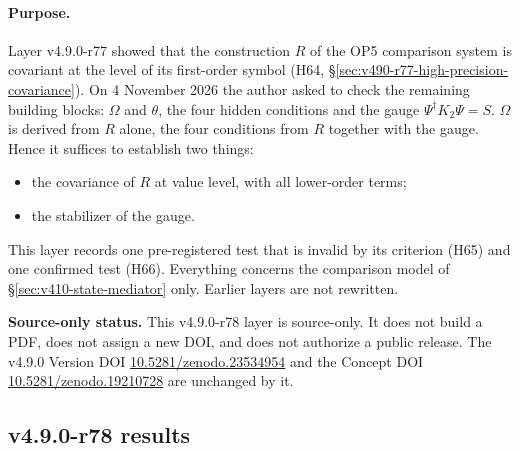 \paragraph{Purpose.}
Layer v4.9.0-r77 showed that the construction \(R\) of the OP5 comparison system is covariant at the level of its first-order
symbol (H64, \S\ref{sec:v490-r77-high-precision-covariance}).  On 4 November 2026 the author asked to check the remaining
building blocks: \(\Omega\) and \(\theta\), the four hidden conditions and the gauge \(\Psi^\dagger K_2\Psi=S\).  \(\Omega\) is
derived from \(R\) alone, the four conditions from \(R\) together with the gauge.  Hence it suffices to establish two things:
\begin{itemize}[leftmargin=2em]
\item the covariance of \(R\) at value level, with all lower-order terms;
\item the stabilizer of the gauge.
\end{itemize}
This layer records one pre-registered test that is invalid by its criterion (H65) and one confirmed test (H66).  Everything
concerns the comparison model of \S\ref{sec:v410-state-mediator} only.  Earlier layers are not rewritten.

\noindent\textbf{Source-only status.}
This v4.9.0-r78 layer is source-only.  It does not build a PDF, does not assign a new DOI,
and does not authorize a public release.  The v4.9.0 Version DOI
\href{https://doi.org/10.5281/zenodo.23534954}{10.5281/zenodo.23534954} and the Concept DOI
\href{https://doi.org/10.5281/zenodo.19210728}{10.5281/zenodo.19210728} are unchanged by it.

\subsection*{v4.9.0-r78 results}
\label{subsec:v490-r78-results}


